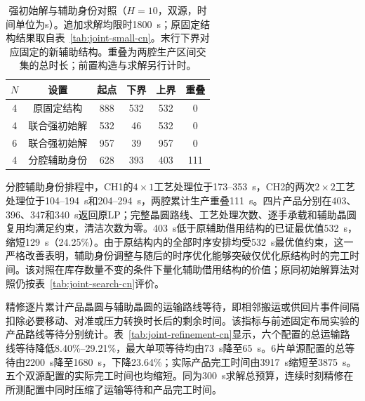 \documentclass[final,5p,times,twocolumn]{elsarticle}
\begin{document}
\begin{table}[!t]
\centering\scriptsize\setlength{\tabcolsep}{2.5pt}
\caption{强初始解与辅助身份对照（$H=10$，双源，时间单位为s）。追加求解均限时1800~s；原固定结构结果取自表~\ref{tab:joint-small-cn}。末行下界对应固定的新辅助结构。重叠为两腔生产区间交集的总时长；前置构造与求解另行计时。}
\label{tab:joint-auxiliary-cn}
\begin{tabular}{cccccc}\toprule
$N$ & 设置 & 起点 & 下界 & 上界 & 重叠\\\midrule
4 & 原固定结构 & 888 & 532 & 532 & 0\\
4 & 联合强初始解 & 532 & 46 & 532 & 0\\
6 & 联合强初始解 & 957 & 39 & 957 & 0\\
4 & 分腔辅助身份 & 628 & 393 & 403 & 111\\
\bottomrule\end{tabular}\end{table}

分腔辅助身份排程中，CH1的$4\times1$工艺处理位于173--353~s，CH2的两次$2\times2$工艺处理位于104--194~s和204--294~s，两腔累计生产重叠111~s。四片产品分别在403、396、347和340~s返回原LP；完整晶圆路线、工艺处理次数、逐手承载和辅助晶圆复用均满足约束，清洁次数为零。403~s低于原辅助借用结构的已证最优值532~s，缩短129~s（24.25\%）。由于原结构内的全部时序安排均受532~s最优值约束，这一严格改善表明，辅助身份调整与随后的时序优化能够突破仅优化原结构时的完工时间。该对照在库存数量不变的条件下量化辅助借用结构的价值；原同初始解算法对照仍按表~\ref{tab:joint-search-cn}评价。

精修逐片累计产品晶圆与辅助晶圆的运输路线等待，即相邻搬运或供回片事件间隔扣除必要移动、对准或压力转换时长后的剩余时间。该指标与前述固定布局实验的产品路线等待分别统计。表~\ref{tab:joint-refinement-cn}显示，六个配置的总运输路线等待降低8.40\%--29.21\%，最大单项等待均由73~s降至65~s。6片单源配置的总等待由2200~s降至1680~s，下降23.64\%；实际产品完工时间由3917~s缩短至3875~s。五个双源配置的实际完工时间也均缩短。同为300~s求解总预算，连续时刻精修在所测配置中同时压缩了运输等待和产品完工时间。
\end{document}
